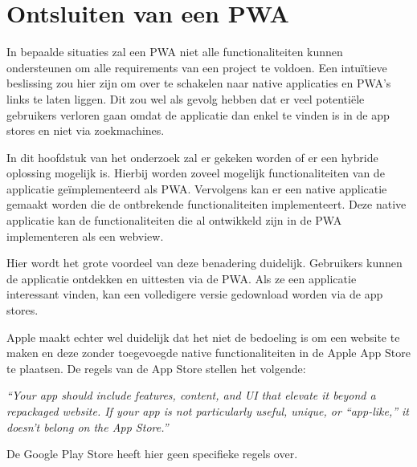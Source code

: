 \clearpage
\section{Ontsluiten van een PWA}
In bepaalde situaties zal een PWA niet alle functionaliteiten kunnen ondersteunen om alle requirements van een project te voldoen. Een intuïtieve beslissing zou hier zijn om over te schakelen naar native applicaties en PWA's links te laten liggen. Dit zou wel als gevolg hebben dat er veel potentiële gebruikers verloren gaan omdat de applicatie dan enkel te vinden is in de app stores en niet via zoekmachines.

In dit hoofdstuk van het onderzoek zal er gekeken worden of er een hybride oplossing mogelijk is. Hierbij worden zoveel mogelijk functionaliteiten van de applicatie geïmplementeerd als PWA. Vervolgens kan er een native applicatie gemaakt worden die de ontbrekende functionaliteiten implementeert. Deze native applicatie kan de functionaliteiten die al ontwikkeld zijn in de PWA implementeren als een webview. 

Hier wordt het grote voordeel van deze benadering duidelijk. Gebruikers kunnen de applicatie ontdekken en uittesten via de PWA. Als ze een applicatie interessant vinden, kan een volledigere versie gedownload worden via de app stores.

Apple maakt echter wel duidelijk dat het niet de bedoeling is om een website te maken en deze zonder toegevoegde native functionaliteiten in de Apple App Store te plaatsen. De regels van de App Store stellen het volgende:

\textit{“Your app should include features, content, and UI that elevate it beyond a repackaged website. If your app is not particularly useful, unique, or “app-like,” it doesn’t belong on the App Store.”}
\autocite{Apple2020c}


De Google Play Store heeft hier geen specifieke regels over.
\autocite{GooglePlay2020a}